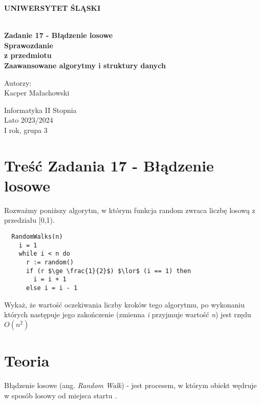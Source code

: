 \documentclass[12pt,oneside,a4paper]{book} %
\theoremstyle{break}
\begin{document}
\thispagestyle{empty}
\begin{center}
  \Large
  \bf{UNIWERSYTET ŚLĄSKI}\\
  \bf{}\\[25mm]
  \large

  \bf{Zadanie 17 - Błądzenie losowe}\\[35mm]

  Sprawozdanie\\
  z przedmiotu\\
  Zaawansowane algorytmy i struktury danych\\[25mm]
\end{center}
\begin{flushright}
  \large
  Autorzy:\\
  Kacper Małachowski\\
\end{flushright}
\vspace*{\fill}
\begin{center}
  Informatyka II Stopnia\\
  Lato 2023/2024\\
  I rok, grupa 3\\[25mm]
\end{center}

\chapter*{Treść Zadania 17 - Błądzenie losowe}

Rozważmy poniższy algorytm, w którym funkcja random zwraca liczbę losową z przedziału [0,1).
\begin{lstlisting}
  RandomWalks(n)
    i = 1
    while i < n do
      r := random()
      if (r $\ge \frac{1}{2}$) $\lor$ (i == 1) then
        i = i + 1
      else i = i - 1
\end{lstlisting}

Wykaż, że wartość oczekiwania liczby kroków tego algorytmu, po wykonaniu których następuje jego zakończenie (zmienna \textit{i} przyjmuje wartość \textit{n}) jest rzędu \textit{$O(n^2)$}

\chapter*{Teoria}

Błądzenie losowe (ang. \textit{Random Walk}) - jest procesem, w którym obiekt wędruje w sposób losowy od miejsca startu \cite{viriginaRandomWalk}.
\end{document}

